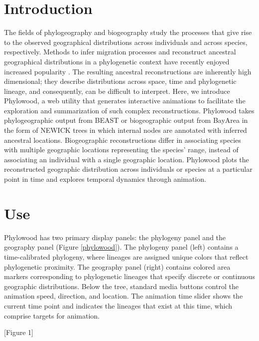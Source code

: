 \documentclass[11pt]{article}
\begin{document}
\section{Introduction}

The fields of phylogeography and biogeography study the processes that give rise to the observed geographical distributions across individuals and across species, respectively. Methods to infer migration processes and reconstruct ancestral geographical distributions in a phylogenetic context have recently enjoyed increased popularity \citep{ree08, lemmon08, lemey09, yu10, landis12}. The resulting ancestral reconstructions are inherently high dimensional; they describe distributions across space, time and phylogenetic lineage, and consequently, can be difficult to interpret. Here, we introduce Phylowood, a web utility that generates interactive animations to facilitate the exploration and summarization of such complex reconstructions.
Phylowood takes phylogeographic output from BEAST \citep{drummond12} or biogeographic output from BayArea \citep{landis12} in the form of NEWICK trees in which internal nodes are annotated with inferred ancestral locations. Biogeographic reconstructions differ in associating species with multiple geographic locations representing the species' range, instead of associating an individual with a single geographic location. Phylowood plots the reconstructed geographic distribution across individuals or species at a particular point in time and explores temporal dynamics through animation.

\section{Use}

Phylowood has two primary display panels: the phylogeny panel and the geography panel (Figure \ref{phylowood}). The phylogeny panel (left) contains a time-calibrated phylogeny, where lineages are assigned unique colors that reflect phylogenetic proximity. The geography panel (right) contains colored area markers corresponding to phylogenetic lineages that specify discrete or continuous geographic distributions. Below the tree, standard media buttons control the animation speed, direction, and location. The animation time slider shows the current time point and indicates the lineages that exist at this time, which comprise targets for animation.

\begin{center}
[Figure 1]
\end{center}
\end{document}
